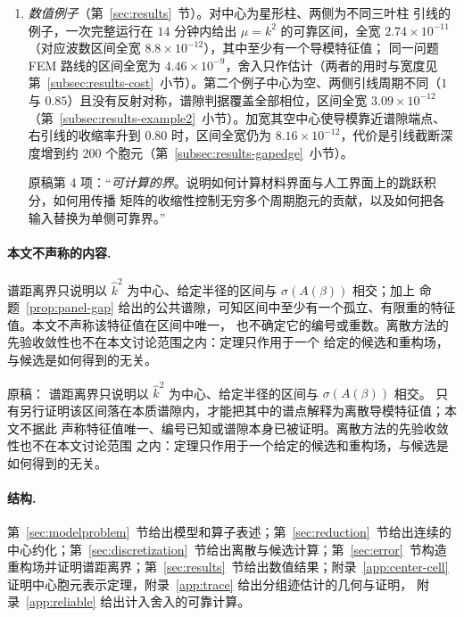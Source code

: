 \begin{enumerate}
    矩阵的惯性测试和 Bloch 能带关于相位的 Lipschitz 界，证明两侧引线的公共谱隙。区间落在其中时，
    其中至少有一个导模特征值。
  \item \emph{数值例子}（第~\ref{sec:results}~节）。对中心为星形柱、两侧为不同三叶柱
    引线的例子，一次完整运行在 $14$ 分钟内给出 $\mu=k^2$ 的可靠区间，全宽
    $2.74\times10^{-11}$（对应波数区间全宽 $8.8\times10^{-12}$），其中至少有一个导模特征值；
    同一问题 FEM 路线的区间全宽为 $4.46\times10^{-9}$，舍入只作估计（两者的用时与宽度见
    第~\ref{subsec:results-cost}~小节）。第二个例子中心为空、两侧引线周期不同（$1$ 与 $0.85$）且没有反射对称，谱隙判据覆盖全部相位，区间全宽 $3.09\times10^{-12}$（第~\ref{subsec:results-example2}~小节）。加宽其空中心使导模靠近谱隙端点、右引线的收缩率升到 $0.80$ 时，区间全宽仍为 $8.16\times10^{-12}$，代价是引线截断深度增到约 $200$ 个胞元（第~\ref{subsec:results-gapedge}~小节）。
\begin{workonly}
原稿第 4 项：“\emph{可计算的界}。说明如何计算材料界面与人工界面上的跳跃积分，如何用传播
矩阵的收缩性控制无穷多个周期胞元的贡献，以及如何把各输入替换为单侧可靠界。”
\end{workonly}
\end{enumerate}

\paragraph{本文不声称的内容.}
谱距离界只说明以 $\widehat k^2$ 为中心、给定半径的区间与 $\sigma(A(\beta))$ 相交；加上
命题~\ref{prop:panel-gap} 给出的公共谱隙，可知区间中至少有一个孤立、有限重的特征值。本文不声称该特征值在区间中唯一，
也不确定它的编号或重数。离散方法的先验收敛性也不在本文讨论范围之内：定理只作用于一个
给定的候选和重构场，与候选是如何得到的无关。

\begin{workonly}
原稿：
谱距离界只说明以 $\widehat k^2$ 为中心、给定半径的区间与 $\sigma(A(\beta))$ 相交。
只有另行证明该区间落在本质谱隙内，才能把其中的谱点解释为离散导模特征值；本文不据此
声称特征值唯一、编号已知或谱隙本身已被证明。离散方法的先验收敛性也不在本文讨论范围
之内：定理只作用于一个给定的候选和重构场，与候选是如何得到的无关。
\end{workonly}

\paragraph{结构.}
第~\ref{sec:modelproblem}~节给出模型和算子表述；第~\ref{sec:reduction}~节给出连续的
中心约化；第~\ref{sec:discretization}~节给出离散与候选计算；第~\ref{sec:error}~节构造
重构场并证明谱距离界；第~\ref{sec:results}~节给出数值结果；附录~\ref{app:center-cell}
证明中心胞元表示定理，附录~\ref{app:trace} 给出分组迹估计的几何与证明，
附录~\ref{app:reliable} 给出计入舍入的可靠计算。

